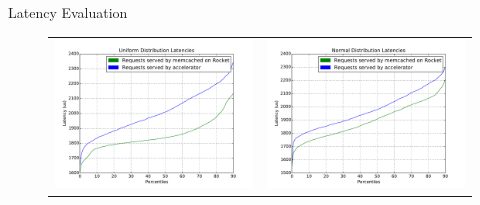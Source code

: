 \begin{block}{Latency Evaluation}
    \vspace{-20mm}
\begin{figure}
\begin{tabular}{cc}
    \includegraphics[width=\linewidth/2]{../img/unif.pdf} & \hspace{-10mm}  \includegraphics[width=\linewidth/2]{../img/norm.pdf} \\

\end{tabular}
\end{figure}
\end{block}
